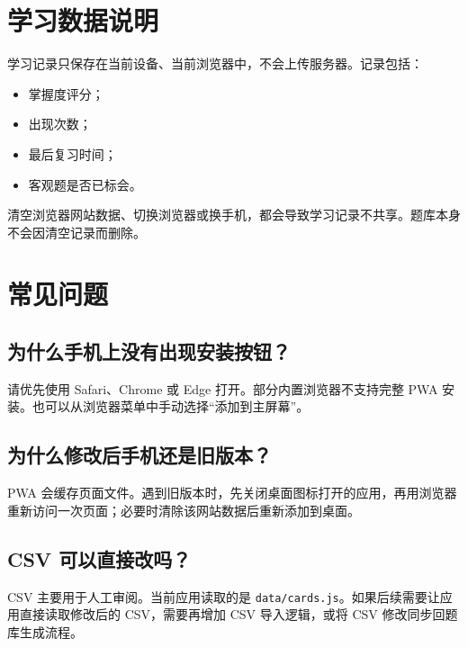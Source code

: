 \documentclass[11pt,a4paper]{ctexart}
\begin{document}
\section{学习数据说明}

学习记录只保存在当前设备、当前浏览器中，不会上传服务器。记录包括：
\begin{itemize}
  \item 掌握度评分；
  \item 出现次数；
  \item 最后复习时间；
  \item 客观题是否已标会。
\end{itemize}

清空浏览器网站数据、切换浏览器或换手机，都会导致学习记录不共享。题库本身不会因清空记录而删除。

\section{常见问题}

\subsection{为什么手机上没有出现安装按钮？}

请优先使用 Safari、Chrome 或 Edge 打开。部分内置浏览器不支持完整 PWA 安装。也可以从浏览器菜单中手动选择“添加到主屏幕”。

\subsection{为什么修改后手机还是旧版本？}

PWA 会缓存页面文件。遇到旧版本时，先关闭桌面图标打开的应用，再用浏览器重新访问一次页面；必要时清除该网站数据后重新添加到桌面。

\subsection{CSV 可以直接改吗？}

CSV 主要用于人工审阅。当前应用读取的是 \texttt{data/cards.js}。如果后续需要让应用直接读取修改后的 CSV，需要再增加 CSV 导入逻辑，或将 CSV 修改同步回题库生成流程。
\end{document}
